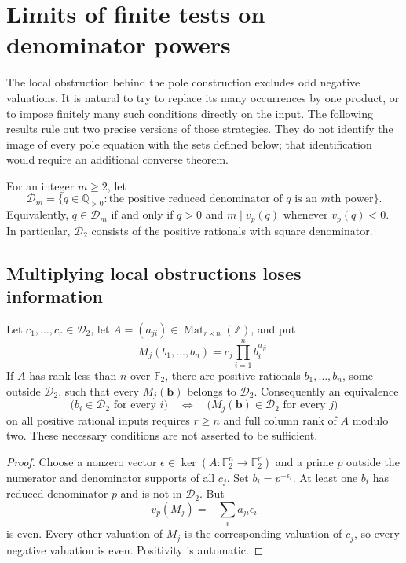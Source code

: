 \section{Limits of finite tests on denominator powers}
\label{sec:denominator-obstructions}

The local obstruction behind the pole construction excludes odd negative
valuations.  It is natural to try to replace its many occurrences by
one product, or to impose finitely many such conditions directly on the
input.  The following results rule out two precise versions of those
strategies.  They do not identify the image of every pole equation with
the sets defined below; that identification would require an additional
converse theorem.

\begin{definition}
For an integer $m\ge2$, let
\[
 \mathcal D_m=\{q\in\mathbb Q_{>0}:
       \text{the positive reduced denominator of $q$ is an $m$th power}\}.
\]
Equivalently, $q\in\mathcal D_m$ if and only if $q>0$ and
$m\mid v_p(q)$ whenever $v_p(q)<0$.  In particular,
$\mathcal D_2$ consists of the positive rationals with square
denominator.
\end{definition}

\subsection{Multiplying local obstructions loses information}

\begin{proposition}\label{prop:denominator-monomial-rank}
Let $c_1,\ldots,c_r\in\mathcal D_2$, let
$A=(a_{ji})\in\operatorname{Mat}_{r\times n}(\mathbb Z)$, and put
\[
 M_j(b_1,\ldots,b_n)=c_j\prod_{i=1}^n b_i^{a_{ji}}.
\]
If $A$ has rank less than $n$ over $\mathbb F_2$, there are positive
rationals $b_1,\ldots,b_n$, some outside $\mathcal D_2$, such that
every $M_j(\mathbf b)$ belongs to $\mathcal D_2$.
Consequently an equivalence
\[
 \bigl(b_i\in\mathcal D_2\text{ for every }i\bigr)
 \quad\Longleftrightarrow\quad
 \bigl(M_j(\mathbf b)\in\mathcal D_2\text{ for every }j\bigr)
\]
on all positive rational inputs requires $r\ge n$ and full column
rank of $A$ modulo two.  These necessary conditions are not asserted
to be sufficient.
\end{proposition}
\begin{proof}
Choose a nonzero vector $\epsilon\in\ker(A:\mathbb F_2^n\to
\mathbb F_2^r)$ and a prime $p$ outside the numerator and denominator
supports of all $c_j$.  Set $b_i=p^{-\epsilon_i}$.  At least one
$b_i$ has reduced denominator $p$ and is not in $\mathcal D_2$.
But
\[
 v_p(M_j)=-\sum_i a_{ji}\epsilon_i
\]
is even.  Every other valuation of $M_j$ is the corresponding
valuation of $c_j$, so every negative valuation is even.  Positivity
is automatic.
\end{proof}

